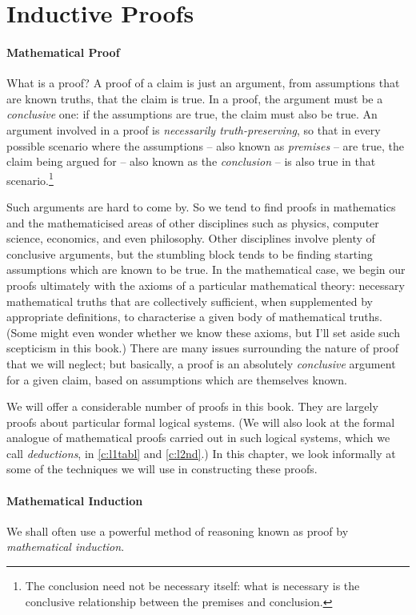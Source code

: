 
\section{Inductive Proofs}

\paragraph{Mathematical Proof} What is a proof? A proof of a claim is just an argument, from assumptions that are known truths, that the claim is true. In a proof, the argument must be a \emph{conclusive} one: if the assumptions are true, the claim must also be true. An argument involved in a proof is \emph{necessarily truth-preserving}, so that in every possible scenario where the assumptions – also known as \emph{premises} – are true, the claim being argued for – also known as the \emph{conclusion} – is also true in that scenario.\footnote{The conclusion need not be necessary itself: what is necessary is the conclusive relationship between the premises and conclusion.}

Such arguments are hard to come by. So we tend to find proofs in mathematics and the mathematicised areas of other disciplines such as physics, computer science, economics, and even philosophy. Other disciplines involve plenty of conclusive arguments, but the stumbling block tends to be finding starting assumptions which are known to be true. In the mathematical case, we begin our proofs  ultimately with the axioms of a particular mathematical theory: necessary mathematical truths that are collectively sufficient, when supplemented by appropriate definitions, to characterise a given body of mathematical truths. (Some might even wonder whether we know these axioms, but I'll set aside such scepticism in this book.) There are many issues surrounding the nature of proof that we will neglect; but basically, a proof is an absolutely \emph{conclusive} argument for a given claim, based on assumptions which are themselves known.

We will offer a considerable number of proofs in this book. They are largely proofs about particular formal logical systems. (We will also look at the formal analogue of mathematical proofs carried out in such logical systems, which we call \emph{deductions}, in \autoref{c:l1tabl} and \autoref{c:l2nd}.) In this chapter, we look informally at some of the techniques we will use in constructing these proofs.

\paragraph{Mathematical Induction}
 We shall often use a powerful method of reasoning known as proof by \emph{mathematical induction}. 

